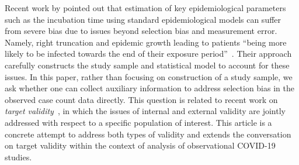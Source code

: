 \documentclass[11pt]{amsart}
\numberwithin{equation}{section}
\theoremstyle{plain}
\begin{document}
Recent work by \cite{Zhao2021} pointed out that estimation of key epidemiological parameters such as the incubation time using standard epidemiological models can suffer from severe bias due to issues beyond selection bias and measurement error.  Namely, right truncation and epidemic growth leading to patients ``being more likely to be infected towards the end of their exposure period''~\citep[pp. 3]{Zhao2021}.  Their approach carefully constructs the study sample and statistical model to account for these issues.  In this paper, rather than focusing on construction of a study sample, we ask whether one can collect auxiliary information to address selection bias in the observed case count data directly. This question is related to recent work on \emph{target validity}~\citep{Westreich2018}, in which the issues of internal and external validity are jointly addressed with respect to a specific population of interest.  This article is a concrete attempt to address both types of validity and extends the conversation on target validity within the context of analysis of observational COVID-19 studies.





\end{document}
